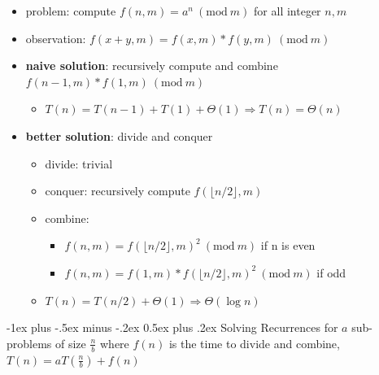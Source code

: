 \documentclass[10pt, landscape]{article}
\makeatletter
\renewcommand{\section}{\@startsection{section}{1}{0mm}%
  {-1ex plus -.5ex minus -.2ex}%
  {0.5ex plus .2ex}%
{\normalfont\large\bfseries}}
\newcommand{\Mod}[1]{\ (\mathrm{mod}\ #1)}
\makeatother
\begin{document}
\begin{multicols*}{4}
  \begin{itemize}
    \item problem: compute $f(n, m) = a^n\Mod{m}$ for all integer $n, m$
    \item observation: $f(x+y, m) = f(x, m) * f(y, m) \Mod{m}$
    \item \textbf{naive solution}: recursively compute and combine $f(n-1, m) * f(1, m) \Mod m$ 
      \begin{itemize}
        \item $T(n) = T(n-1) + T(1) + \Theta(1) \Rightarrow T(n) = \Theta (n)$
      \end{itemize}
    \item \textbf{better solution}: divide and conquer
      \begin{itemize}
        \item divide: trivial
        \item conquer: recursively compute $f(\lfloor n / 2 \rfloor, m)$ 
        \item combine: 
          \begin{itemize}
            \item $f(n, m) = f(\lfloor n / 2 \rfloor, m)^2 \Mod m$ if n is even
            \item $f(n, m) = f(1, m) * f(\lfloor n / 2 \rfloor, m)^2 \Mod m$ if odd
          \end{itemize}
        \item $T(n) = T(n/2) + \Theta(1) \Rightarrow \Theta(\log n)$
      \end{itemize}
  \end{itemize}

  \section{Solving Recurrences}
  for $a$ sub-problems of size $\frac{n}{b}$ where $f(n)$ is the time to divide and combine,
  \begin{math}
    T(n) = aT(\frac{n}{b}) + f(n)
  \end{math}


\end{multicols*}
\end{document}
